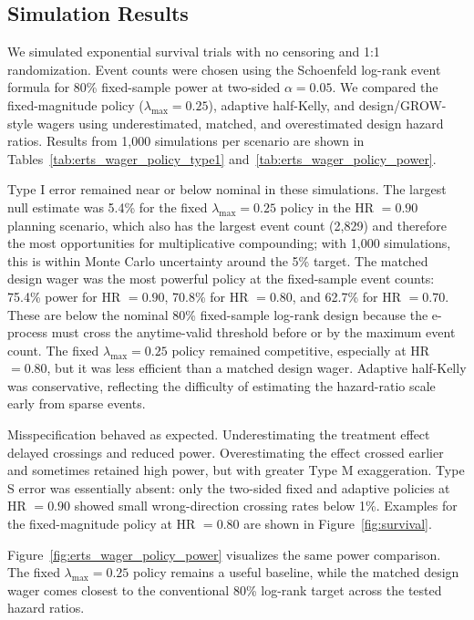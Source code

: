 \documentclass[10pt]{article}
\begin{document}
\subsection{Simulation Results}

We simulated exponential survival trials with no censoring and 1:1 randomization. Event counts were chosen using the Schoenfeld log-rank event formula for 80\% fixed-sample power at two-sided $\alpha=0.05$. We compared the fixed-magnitude policy ($\lambda_{\max}=0.25$), adaptive half-Kelly, and design/GROW-style wagers using underestimated, matched, and overestimated design hazard ratios. Results from 1{,}000 simulations per scenario are shown in Tables~\ref{tab:erts_wager_policy_type1} and~\ref{tab:erts_wager_policy_power}.



Type I error remained near or below nominal in these simulations. The largest null estimate was 5.4\% for the fixed $\lambda_{\max}=0.25$ policy in the HR $=0.90$ planning scenario, which also has the largest event count (2{,}829) and therefore the most opportunities for multiplicative compounding; with 1{,}000 simulations, this is within Monte Carlo uncertainty around the 5\% target. The matched design wager was the most powerful policy at the fixed-sample event counts: 75.4\% power for HR $=0.90$, 70.8\% for HR $=0.80$, and 62.7\% for HR $=0.70$. These are below the nominal 80\% fixed-sample log-rank design because the e-process must cross the anytime-valid threshold before or by the maximum event count. The fixed $\lambda_{\max}=0.25$ policy remained competitive, especially at HR $=0.80$, but it was less efficient than a matched design wager. Adaptive half-Kelly was conservative, reflecting the difficulty of estimating the hazard-ratio scale early from sparse events.

Misspecification behaved as expected. Underestimating the treatment effect delayed crossings and reduced power. Overestimating the effect crossed earlier and sometimes retained high power, but with greater Type M exaggeration. Type S error was essentially absent: only the two-sided fixed and adaptive policies at HR $=0.90$ showed small wrong-direction crossing rates below 1\%. Examples for the fixed-magnitude policy at HR $=0.80$ are shown in Figure~\ref{fig:survival}.

Figure~\ref{fig:erts_wager_policy_power} visualizes the same power comparison. The fixed $\lambda_{\max}=0.25$ policy remains a useful baseline, while the matched design wager comes closest to the conventional 80\% log-rank target across the tested hazard ratios.
\end{document}
